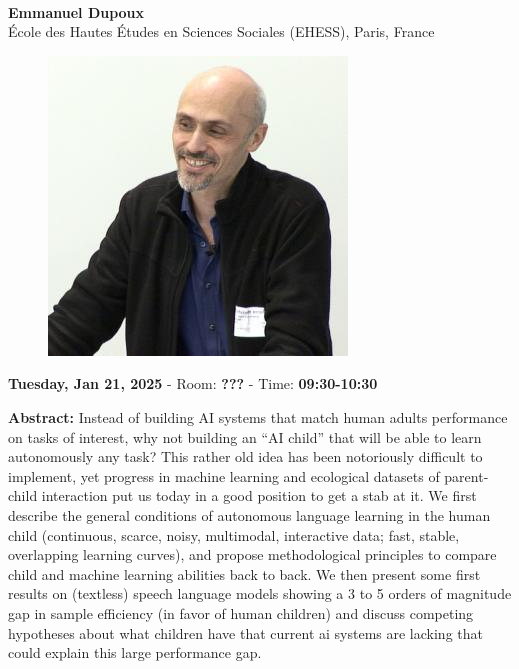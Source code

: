 \leavevmode\newline \leavevmode\newline
{\centering
{}\\  \vspace*{-0.1cm} \leavevmode\newline
{\normalsize \textbf{Emmanuel Dupoux}}\\
{\normalsize {École des Hautes Études en Sciences Sociales (EHESS), Paris, France}}\\


\begin{figure}[h!]
  \centering
      \includegraphics[width=0.15\linewidth]{invited_talks/emmanuel_dupoux_invited_1.png}
\end{figure}

 {\normalsize \textbf{Tuesday, Jan 21, 2025} -
 Room: \textbf{???} -
 Time: \textbf{09:30-10:30}\\\leavevmode\newline
 }
}

{\textbf{Abstract:}}
Instead of building AI systems that match human adults performance on tasks of interest, why not building an “AI child” that will be able to learn autonomously any task? This rather old idea has been notoriously difficult to implement, yet progress in machine learning and ecological datasets of parent- child interaction put us today in a good position to get a stab at it. We first describe the general conditions of autonomous language learning in the human child (continuous, scarce, noisy, multimodal, interactive data; fast, stable, overlapping learning curves), and propose methodological principles to compare child and machine learning abilities back to back. We then present some first results on (textless) speech language models showing a 3 to 5 orders of magnitude gap in sample efficiency (in favor of human children) and discuss competing hypotheses about what children have that current ai systems are lacking that could explain this large performance gap.\\

